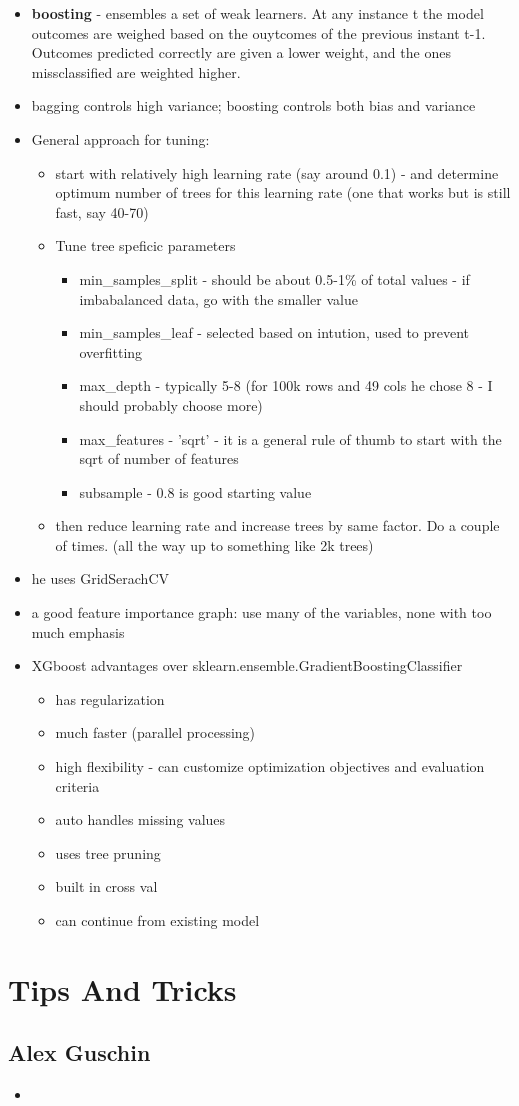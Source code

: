 \documentclass[a4paper]{report}
\begin{document}
\begin{itemize}
  \item {\bf boosting} - ensembles a set of weak learners. At any instance t the model outcomes are weighed based on the ouytcomes of the previous instant t-1. Outcomes predicted correctly are given a lower weight, and the ones missclassified are weighted higher.
  \item bagging controls high variance; boosting controls both bias and variance
  \item General approach for tuning:
    \begin{itemize}
      \item start with relatively high learning rate (say around 0.1) - and determine optimum number of trees for this learning rate (one that works but is still fast, say 40-70)
      \item Tune tree speficic parameters
	\begin{itemize}
	  \item min\_samples\_split - should be about 0.5-1\% of total values  - if imbabalanced data, go with the smaller value
	  \item min\_samples\_leaf - selected based on intution, used to prevent overfitting
	  \item max\_depth - typically 5-8 (for 100k rows and 49 cols he chose 8 - I should probably choose more)
	  \item max\_features - 'sqrt' - it is a general rule of thumb to start with the sqrt of number of features
	  \item subsample  - 0.8 is good starting value
	\end{itemize}
      \item then reduce learning rate and increase trees by same factor. Do a couple of times. (all the way up to something like 2k trees)
    \end{itemize}
  \item he uses GridSerachCV
  \item a good feature importance graph: use many of the variables, none with too much emphasis
  \item XGboost advantages over sklearn.ensemble.GradientBoostingClassifier
    \begin{itemize}
      \item has regularization
      \item much faster (parallel processing)
      \item high flexibility - can customize optimization objectives and evaluation criteria
      \item auto handles missing values
      \item uses tree pruning
      \item built in cross val
      \item can continue from existing model
    \end{itemize}
\end{itemize}	


\section{Tips And Tricks}
\subsection{Alex Guschin}
\begin{itemize}
  \item
\end{itemize}
\end{document}
